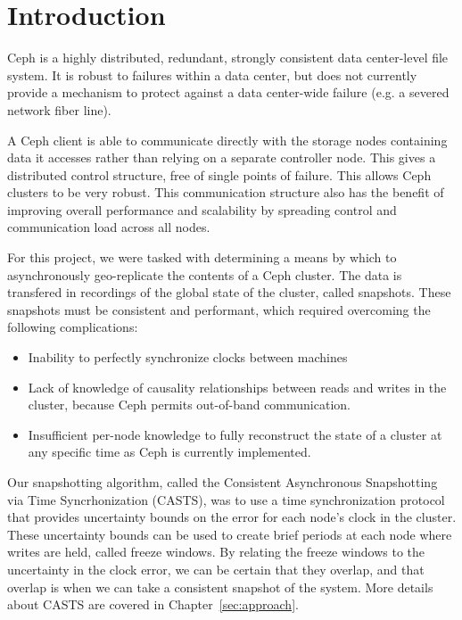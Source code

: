 \chapter{Introduction}
\label{sec:introduction}

Ceph is a highly distributed, redundant, strongly consistent data
center-level file system. It is robust to failures within a data
center, but does not currently provide a mechanism to protect against
a data center-wide failure (e.g. a severed network fiber line).

A Ceph client is able to communicate directly with the storage nodes
containing data it accesses rather than relying on a separate
controller node. This gives a distributed control structure, free of
single points of failure. This allows Ceph clusters to be very
robust. This communication structure also has the benefit of improving
overall performance and scalability by spreading control and
communication load across all nodes.

For this project, we were tasked with determining a means by which to
asynchronously geo-replicate the contents of a Ceph cluster. The data is 
transfered in recordings of the global state of the cluster, called snapshots.
These snapshots must be consistent and performant, which required overcoming 
the following complications:

\begin{itemize}
\item Inability to perfectly synchronize clocks between machines
\item Lack of knowledge of causality relationships between reads and
  writes in the cluster, because Ceph permits out-of-band
  communication.
\item Insufficient per-node knowledge to fully reconstruct the state
  of a cluster at any specific time as Ceph is currently implemented.
\end{itemize}

Our snapshotting algorithm, called the Consistent Asynchronous Snapshotting via Time Syncrhonization (CASTS), was to use a time synchronization protocol that provides
uncertainty bounds on the error for each node's clock in the cluster. These
uncertainty bounds can be used to create brief periods at each node where writes are 
held, called freeze windows. By relating the freeze windows to the uncertainty 
in the clock error, we can be certain that they overlap, and that overlap
is when we can take a consistent snapshot of the system. More details
about CASTS are covered in Chapter~\ref{sec:approach}.


